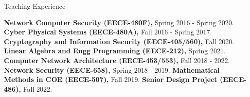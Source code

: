 \begin{rubric}{Teaching Experience}

%
\textbf{Network Computer Security (EECE-480F),} Spring 2016 - Spring 2020.
%
\textbf{Cyber Physical Systems (EECE-480A),} Fall 2016 - Spring 2017.
\entry*[]%
\textbf{Cryptography and Information Security (EECE-405/560),} Fall 2020.
\entry*[]%
\textbf{Linear Algebra and Engg Programming (EECE-212),} Spring 2021.
%
%
\textbf{Computer Network Architecture (EECE-453/553),} Fall 2018 - 2022.
\entry*[]%
\textbf{Network Security (EECE-658),} Spring 2018 - 2019.
\entry*[]%
\textbf{Mathematical Methods in COE (EECE-507),} Fall 2019.
\entry*[]%
\textbf{Senior Design Project (EECE-486),} Fall 2022.
\end{rubric}